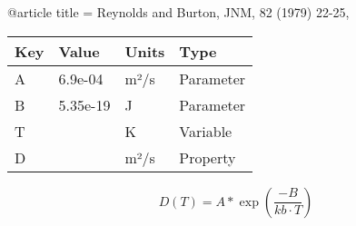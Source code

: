 @article{
title = {Reynolds and Burton, JNM, 82 (1979) 22-25},
}

\begin{tabular}{|l|l|l|l|}
    \hline
    Key & Value & Units & Type \\
    \hline
    A & 6.9e-04 & m²/s & Parameter\\
    B & 5.35e-19 & J & Parameter \\
    T &   & K    & Variable\\
    D &   & m²/s  & Property\\
    \hline
\end{tabular}

\begin{equation}
D(T)=A*\exp(\frac{-B}{kb \cdot T})
\end{equation}

